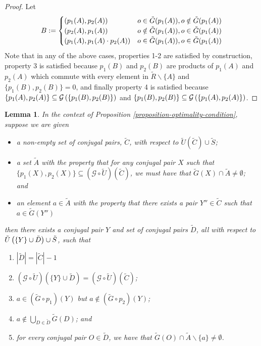 \documentclass[twocolumn,showpacs,preprintnumbers,amsmath,amssymb,nofootinbib,pra,floatfix]{revtex4-1}
\newtheorem{lemma}{Lemma}
\newcommand{\set}{\tilde}
\newcommand{\genfun}{\mathcal{G}}
\begin{document}
\begin{proof}
Let
$$
B:=
\begin{cases}
\paren{p_1(A),p_2(A)} & o\in \set G(p_1(A)), o\notin \set G(p_1(A)) \\
\paren{p_2(A),p_1(A)} & o\notin \set G(p_1(A)), o\in\set G(p_1(A)) \\
\paren{p_1(A),p_1(A)\cdot p_2(A)} & o\in\set G(p_1(A)), o\in\set G(p_1(A)) \\
\end{cases}
$$
Note that in any of the above cases, properties 1-2 are satisfied by construction, property 3 is satisfied because $p_1(B)$ and $p_2(B)$ are products of $p_1(A)$ and $p_2(A)$ which commute with every element in $\set R\backslash\{A\}$ and $\{p_1(B),p_2(B)\}=0$, and finally property 4 is satisfied because $\{p_1(A),p_2(A)\}\subseteq \genfun\paren{\{p_1(B),p_2(B)\}}$ and $\{p_1(B),p_2(B)\}\subseteq \genfun\paren{\{p_1(A),p_2(A)\}}$.
\end{proof}
\begin{lemma}
\label{directed-gaussian-elimination-of-logicals}
In the context of Proposition \ref{proposition-optimality-condition}, suppose we are given
\begin{itemize}
\item a non-empty set of conjugal pairs, $\set C$, with respect to $\set U(\set C) \cup \set S$;
\item a set $\set A$ with the property that for any conjugal pair $X$ such that $\{p_1(X),p_2(X)\}\subseteq(\genfun\circ\set U)(\set C)$, we must have that $\set G(X) \cap \set A \ne \emptyset$; and
\item an element $a\in \set A$ with the property that there exists a pair $Y''\in\set C$ such that $a\in\set G(Y'')$
\end{itemize}
then there exists a conjugal pair $Y$ and set of conjugal pairs $\set D$, all with respect to $\set U\paren{\{Y\}\cup \set D} \cup \set S$, such that
\begin{enumerate}
\item $|\set D| = |\set C|-1$
\item $(\genfun\circ\set U)(\{Y\}\cup \set D)=(\genfun\circ\set U)(\set C)$;
\item $a\in (\set G\circ p_1)(Y)$ but $a\notin (\set G\circ p_2)(Y)$;
\item $a\notin \bigcup_{D\in \set D} \set G(D)$; and
\item for every conjugal pair $O\in\set D$, we have that $\set G(O) \cap \set A\backslash \{a\} \ne \emptyset$.
\end{enumerate}
\end{lemma}
\end{document}
